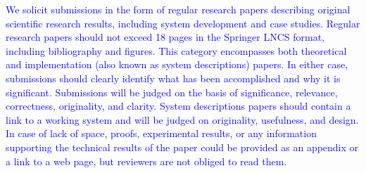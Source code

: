 \documentclass[runningheads]{llncs}
\newcommand{\blue}[1]{\textcolor{blue}{#1 }}
\begin{document}
\blue{We solicit submissions in the form of regular research papers describing original scientific research results, including system development and case studies. Regular research papers should not exceed 18 pages in the Springer LNCS format, including bibliography and figures. This category encompasses both theoretical and implementation (also known as system descriptions) papers. In either case, submissions should clearly identify what has been accomplished and why it is significant. Submissions will be judged on the basis of significance, relevance, correctness, originality, and clarity. System descriptions papers should contain a link to a working system and will be judged on originality, usefulness, and design. In case of lack of space, proofs, experimental results, or any information supporting the technical results of the paper could be provided as an appendix or a link to a web page, but reviewers are not obliged to read them.}
\end{document}
